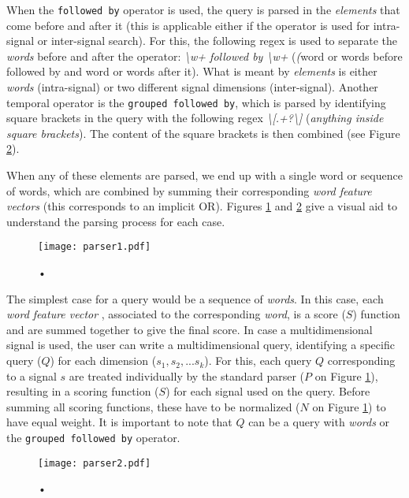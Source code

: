 {When the \texttt{followed by} operator is used, the query is parsed in the \textit{elements} that come before and after it (this is applicable either if the operator is used for intra-signal or inter-signal search). For this, the following \gls{regex} is used to separate the \textit{words} before and after the operator: \textit{\textbackslash w+ followed by \textbackslash w+} (\textit(word or words before followed by and word or words after it). What is meant by \textit{elements} is either \textit{words} (intra-signal) or two different signal dimensions (inter-signal). Another temporal operator is the \texttt{grouped followed by}, which is parsed by identifying square brackets in the query with the following \gls{regex} \textit{\textbackslash[.+?\textbackslash]} (\textit{anything inside square brackets}). The content of the square brackets is then combined (see Figure \ref{fig:parser2}).
\par
When any of these elements are parsed, we end up with a single word or sequence of words, which are combined by summing their corresponding \textit{word feature vectors} (this corresponds to an implicit OR). Figures \ref{fig:parser1} and \ref{fig:parser2} give a visual aid to understand the parsing process for each case.

\begin{figure}
\centering
\texttt{[image: parser1.pdf]}
\label{fig:parser1}
\caption{•}
\end{figure}

The simplest case for a query would be a sequence of \textit{words}. In this case, each \textit{word feature vector} ,  associated to the corresponding \textit{word}, is a score ($S$) function and are summed together to give the final score. In case a multidimensional signal is used, the user can write a multidimensional query, identifying a specific query ($Q$) for each dimension ($s_1, s_2,...s_k$). For this, each query $Q$ corresponding to a signal $s$ are treated individually by the standard parser ($P$ on Figure \ref{fig:parser1}), resulting in a scoring function ($S$) for each signal used on the query. Before summing all scoring functions, these have to be normalized ($N$ on Figure \ref{fig:parser1}) to have equal weight. It is important to note that $Q$ can be a query with \textit{words} or the \texttt{grouped followed by} operator.

\begin{figure}
\centering
\texttt{[image: parser2.pdf]}
\label{fig:parser2}
\caption{•}
\end{figure}

}
